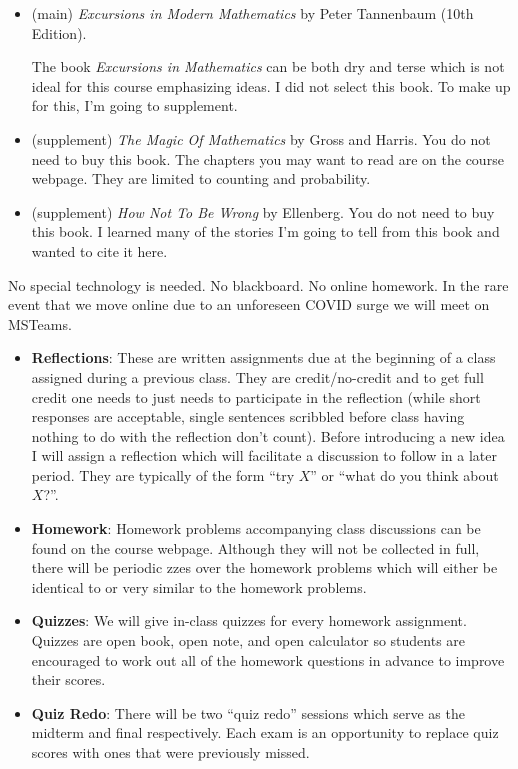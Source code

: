 \documentclass[11pt, letterpaper]{article}
\theoremstyle{definition}
\theoremstyle{remark}
\begin{document}
\begin{itemize}
\item (main) {\it Excursions in Modern Mathematics} by Peter Tannenbaum (10th Edition).

The book \emph{Excursions in Mathematics} can be both dry and terse which is not ideal for this course emphasizing ideas. 
I did not select this book. 
To make up for this, I'm going to supplement.

\item (supplement) \emph{The Magic Of Mathematics} by Gross and Harris. 
You do not need to buy this book. The chapters you may want to read are on the course webpage. They are limited to counting and probability.

\item (supplement) \emph{How Not To Be Wrong} by Ellenberg. 
You do not need to buy this book. I learned many of the stories I'm going to tell from this book and wanted to cite it here.
\end{itemize}



\vspace{1em}


 No special technology is needed. 
No blackboard. 
No online homework. 
In the rare event that we move online due to an unforeseen COVID surge we will meet on MSTeams.
\vspace{1em}




\begin{itemize}
	\item {\bf Reflections}: These are written assignments due at the beginning of a class assigned during a previous class. 
	They are credit/no-credit and to get full credit one needs to just needs to participate in the reflection (while short responses are acceptable, single sentences scribbled before class having nothing to do with the reflection don't count). 
	Before introducing a new idea I will assign a reflection which will facilitate a discussion to follow in a later period. 
	They are typically of the form ``try $X$'' or ``what do you think about $X$?''.
	\item {\bf Homework}: Homework problems accompanying class discussions can be found on the course webpage. Although they will not be collected in full, there will be periodic zzes over the homework problems which will either be identical to or very similar to the homework problems.
	\item {\bf Quizzes}: We will give in-class quizzes for every homework assignment. Quizzes are open book, open note, and open calculator so students are encouraged to work out all of the homework questions in advance to improve their scores.
	\item {\bf Quiz Redo}: There will be two ``quiz redo'' sessions which serve as the midterm and final respectively. 
	Each exam is an opportunity to replace quiz scores with ones that were previously missed.
\end{itemize}
\end{document}
